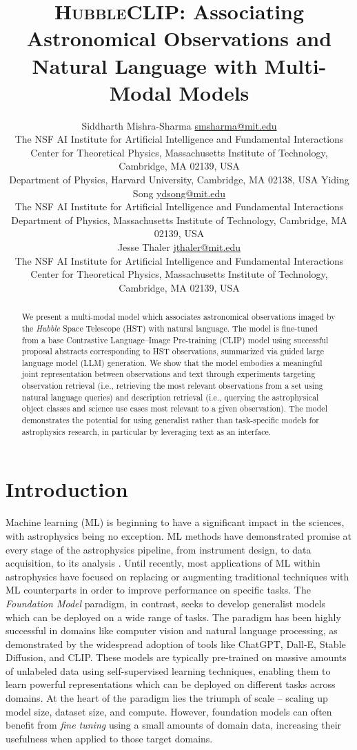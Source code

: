 \documentclass[10pt]{article} %
\title{\textsc{HubbleCLIP}: Associating Astronomical Observations and Natural Language with Multi-Modal Models}
\author{\name Siddharth Mishra-Sharma \email \href{mailto:smsharma@mit.edu}{smsharma@mit.edu} \\
      \addr The NSF AI Institute for Artificial Intelligence and Fundamental Interactions\\
      Center for Theoretical Physics, Massachusetts Institute of Technology, Cambridge, MA 02139, USA \\
      Department of Physics, Harvard University, Cambridge, MA 02138, USA
      \AND
      \name Yiding Song \email \href{mailto:ydsong@mit.edu}{ydsong@mit.edu} \\
      \addr The NSF AI Institute for Artificial Intelligence and Fundamental Interactions\\
      Department of Physics, Massachusetts Institute of Technology, Cambridge, MA 02139, USA \\
      \AND
      \name Jesse Thaler \email \href{mailto:jthaler@mit.edu}{jthaler@mit.edu} \\
      \addr The NSF AI Institute for Artificial Intelligence and Fundamental Interactions\\
      Center for Theoretical Physics, Massachusetts Institute of Technology, Cambridge, MA 02139, USA \\
}
\newcommand{\hubble}{\emph{Hubble}\xspace}
\begin{document}
\maketitle

\thispagestyle{firstpage}

\begin{abstract}
We present a multi-modal model which associates astronomical observations imaged by the \hubble Space Telescope (HST) with natural language. The model is fine-tuned from a base Contrastive Language–Image Pre-training (CLIP) model using successful proposal abstracts corresponding to HST observations, summarized via guided large language model (LLM) generation. We show that the model embodies a meaningful joint representation between observations and text through experiments targeting observation retrieval (i.e., retrieving the most relevant observations from a set using natural language queries) and description retrieval (i.e., querying the astrophysical object classes and science use cases most relevant to a given observation). The model demonstrates the potential for using generalist rather than task-specific models for astrophysics research, in particular by leveraging text as an interface.
\end{abstract}

\section{Introduction}
\label{sec:intro}

Machine learning (ML) is beginning to have a significant impact in the sciences, with astrophysics being no exception. ML methods have demonstrated promise at every stage of the astrophysics pipeline, from instrument design, to data acquisition, to its analysis \citep{huertas2022dawes}. Until recently, most applications of ML within astrophysics have focused on replacing or augmenting traditional techniques with ML counterparts in order to improve performance on specific tasks. The \emph{Foundation Model} paradigm, in contrast, seeks to develop generalist models which can be deployed on a wide range of tasks. The paradigm has been highly successful in domains like computer vision and natural language processing, as demonstrated by the widespread adoption of tools like ChatGPT, Dall-E, Stable Diffusion, and CLIP. These models are typically pre-trained on massive amounts of unlabeled data using self-supervised learning techniques, enabling them to learn powerful representations which can be deployed on different tasks across domains. At the heart of the paradigm lies the triumph of scale -- scaling up model size, dataset size, and compute. However, foundation models can often benefit from \emph{fine tuning} using a small amounts of domain data, increasing their usefulness when applied to those target domains.
\end{document}
